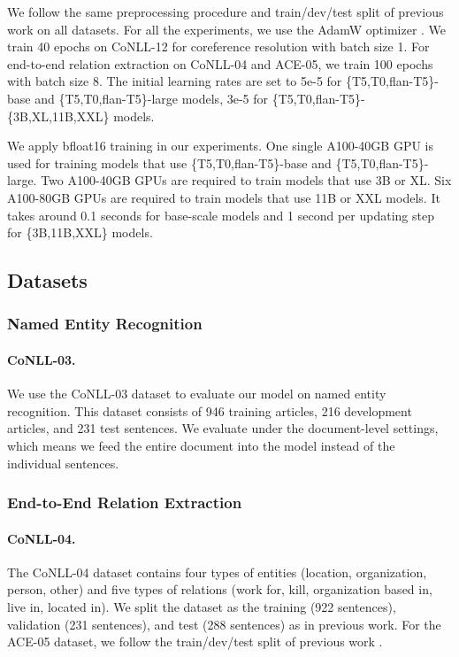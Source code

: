 \documentclass[11pt]{article}
\begin{document}
We follow the same preprocessing procedure and train/dev/test split of previous work on all datasets. For all the experiments, we use the AdamW optimizer \cite{kingma2015adam}. 
We train 40 epochs on CoNLL-12 for coreference resolution with batch size 1. For end-to-end relation extraction on CoNLL-04 and ACE-05, we train 100 epochs with batch size 8. The initial learning rates are set to 5e-5 for \{T5,T0,flan-T5\}-base and \{T5,T0,flan-T5\}-large models, 3e-5 for \{T5,T0,flan-T5\}-\{3B,XL,11B,XXL\} models.


We apply bfloat16 training in our experiments. One single A100-40GB GPU is used for training models that use \{T5,T0,flan-T5\}-base and \{T5,T0,flan-T5\}-large. Two A100-40GB GPUs are required to train models that use 3B or XL. Six A100-80GB GPUs are required to train models that use 11B or XXL models.
It takes around 0.1 seconds for base-scale models and 1 second per updating step for \{3B,11B,XXL\} models.

\subsection{Datasets} \label{appendix:datasets}

\subsubsection{Named Entity Recognition}
\paragraph{CoNLL-03.}
We use the CoNLL-03 dataset \cite{tjong-kim-sang-de-meulder-2003-introduction} to evaluate our model on named entity recognition. This dataset consists of 946 training articles, 216 development articles, and 231 test sentences. We evaluate under the document-level settings, which means we feed the entire document into the model instead of the individual sentences.


\subsubsection{End-to-End Relation Extraction}
\paragraph{CoNLL-04.}
The CoNLL-04 dataset contains four types of entities (location, organization, person, other) and five types of relations (work for, kill, organization based in, live in, located in).
We split the dataset as the training (922 sentences), validation (231 sentences), and test (288 sentences) as in previous work.
For the ACE-05 dataset, we follow the train/dev/test split of previous work \cite{zhong-chen-2021-frustratingly}.
\end{document}
